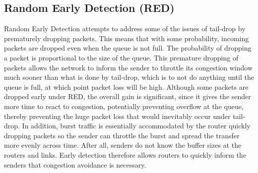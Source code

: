 \documentclass[12pt]{article}
\begin{document}
\subsection{Random Early Detection (RED)}
Random Early Detection attempts to address some of the issues of tail-drop by prematurely dropping packets. This means that with some probability, incoming packets are dropped even when the queue is not full. The probability of dropping a packet is proportional to the size of the queue. This premature dropping of packets allows the network to inform the sender to throttle its congestion window much sooner than what is done by tail-drop, which is to not do anything until the queue is full, at which point packet loss will be high. Although some packets are dropped early under RED, the overall gain is significant, since it gives the sender more time to react to congestion, potentially preventing overflow at the queue, thereby preventing the huge packet loss that would inevitably occur under tail-drop. In addition, burst traffic is essentially accommodated by the router quickly dropping packets so the sender can throttle the burst and spread the transfer more evenly across time. After all, senders do not know the buffer sizes at the routers and links. Early detection therefore allows routers to quickly inform the senders that congestion avoidance is necessary. 
\end{document}
